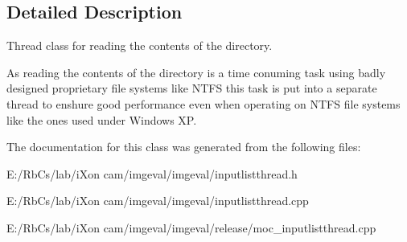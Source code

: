 \subsection{Detailed Description}
Thread class for reading the contents of the directory. 

As reading the contents of the directory is a time conuming task using badly designed proprietary file systems like NTFS this task is put into a separate thread to enshure good performance even when operating on NTFS file systems like the ones used under Windows XP. 

The documentation for this class was generated from the following files:\begin{CompactItemize}
\item 
E:/RbCs/lab/iXon cam/imgeval/imgeval/inputlistthread.h\item 
E:/RbCs/lab/iXon cam/imgeval/imgeval/inputlistthread.cpp\item 
E:/RbCs/lab/iXon cam/imgeval/imgeval/release/moc\_\-inputlistthread.cpp\end{CompactItemize}
